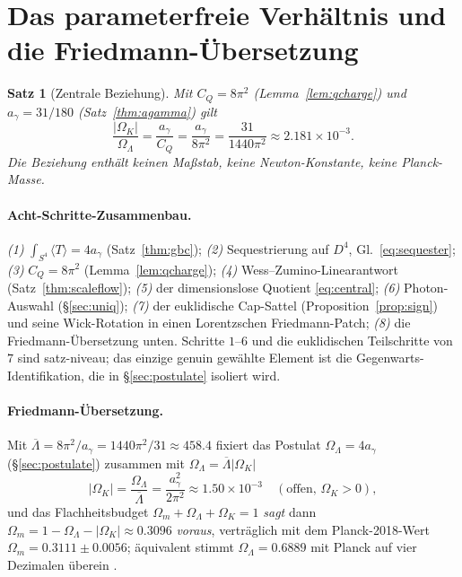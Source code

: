 \documentclass[11pt,a4paper]{article}
\newtheorem{theorem}{Satz}
\theoremstyle{definition}
\theoremstyle{remark}
\newcommand{\ag}{a_\gamma}
\newcommand{\CQ}{C_Q}
\newcommand{\Ok}{\Omega_K}
\newcommand{\OL}{\Omega_\Lambda}
\newcommand{\Om}{\Omega_m}
\newcommand{\avg}[1]{\langle #1\rangle}
\begin{document}
\section{Das parameterfreie Verhältnis und die Friedmann-Übersetzung}\label{sec:friedmann}
\begin{theorem}[Zentrale Beziehung]\label{thm:central}
Mit $\CQ=8\pi^2$ (Lemma~\ref{lem:qcharge}) und $\ag=31/180$ (Satz~\ref{thm:agamma}) gilt
\begin{equation}\label{eq:central}
\frac{\lvert\Ok\rvert}{\OL}=\frac{\ag}{\CQ}=\frac{\ag}{8\pi^2}=\frac{31}{1440\pi^2}\approx2.181\times10^{-3}.
\end{equation}
Die Beziehung enthält keinen Maßstab, keine Newton-Konstante, keine Planck-Masse.
\end{theorem}

\paragraph{Acht-Schritte-Zusammenbau.}
\emph{(1)} $\int_{S^4}\avg{T}=4\ag$ (Satz~\ref{thm:gbc}); \emph{(2)} Sequestrierung auf $D^4$,
Gl.~\eqref{eq:sequester}; \emph{(3)} $\CQ=8\pi^2$ (Lemma~\ref{lem:qcharge}); \emph{(4)}
Wess--Zumino-Linearantwort (Satz~\ref{thm:scaleflow}); \emph{(5)} der dimensionslose Quotient
\eqref{eq:central}; \emph{(6)} Photon-Auswahl (\S\ref{sec:uniq}); \emph{(7)} der euklidische
Cap-Sattel (Proposition~\ref{prop:sign}) und seine Wick-Rotation in einen Lorentzschen
Friedmann-Patch; \emph{(8)} die Friedmann-Übersetzung unten. Schritte $1$--$6$ und die euklidischen
Teilschritte von $7$ sind satz-niveau; das einzige genuin gewählte Element ist die
Gegenwarts-Identifikation, die in \S\ref{sec:postulate} isoliert wird.

\paragraph{Friedmann-Übersetzung.} Mit $\overline\Lambda=8\pi^2/\ag=1440\pi^2/31\approx458.4$ fixiert
das Postulat $\OL=4\ag$ (\S\ref{sec:postulate}) zusammen mit $\OL=\overline\Lambda\lvert\Ok\rvert$
\begin{equation}\label{eq:OK}
\lvert\Ok\rvert=\frac{\OL}{\overline\Lambda}=\frac{\ag^2}{2\pi^2}\approx1.50\times10^{-3}
\quad(\text{offen, }\Ok>0),
\end{equation}
und das Flachheitsbudget $\Om+\OL+\Ok=1$ \emph{sagt} dann $\Om=1-\OL-\lvert\Ok\rvert\approx0.3096$
\emph{voraus}, verträglich mit dem Planck-2018-Wert $\Om=0.3111\pm0.0056$; äquivalent stimmt
$\OL=0.6889$ mit Planck auf vier Dezimalen überein \cite{Planck2018}.
\end{document}
